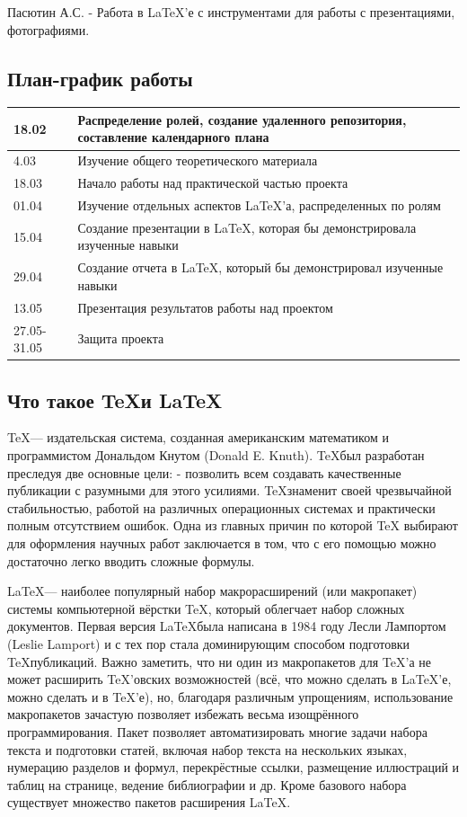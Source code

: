 \documentclass{article}
\begin{document}
\vspace{\baselineskip}
Пасютин А.С. - Работа в LaTeX’е с инструментами для работы с презентациями, фотографиями.

\subsection*{План-график работы}
\begin{tabular}{|l|p{}|}
	\hline
	18.02 & Распределение ролей, создание удаленного репозитория, составление календарного плана \\
	\hline
	4.03 & Изучение общего теоретического материала \\
	\hline
	18.03 & Начало работы над практической частью проекта \\
	\hline
	01.04 & Изучение отдельных аспектов \LaTeX’а, распределенных по ролям \\
	\hline
	15.04 & Создание презентации в \LaTeX, которая бы демонстрировала изученные навыки \\
	\hline
	29.04 & Создание отчета в \LaTeX, который бы демонстрировал изученные навыки
	\\
	\hline
	13.05 & Презентация результатов работы над проектом \\
	\hline
	27.05-31.05 & Защита проекта \\
	\hline
\end{tabular}

\subsection*{Что такое \TeX и \LaTeX}
\TeX — издательская система, созданная американским математиком и программистом Дональдом Кнутом (Donald E. Knuth). \TeX был разработан преследуя две основные цели: - позволить всем создавать качественные публикации с разумными для этого усилиями. \TeX знаменит своей чрезвычайной стабильностью, работой на различных операционных системах и практически полным отсутствием ошибок. Одна из главных причин по которой TeX выбирают для оформления научных работ заключается в том, что с его помощью можно достаточно легко вводить сложные формулы.

\vspace{\baselineskip}
\LaTeX — наиболее популярный набор макрорасширений (или макропакет) системы компьютерной вёрстки TeX, который облегчает набор сложных документов. Первая версия \LaTeX была написана в 1984 году Лесли Лампортом (Leslie Lamport) и с тех пор стала доминирующим способом подготовки \TeX публикаций. Важно заметить, что ни один из макропакетов для \TeX’а не может расширить \TeX’овских возможностей (всё, что можно сделать в LaTeX’е, можно сделать и в \TeX’е), но, благодаря различным упрощениям, использование макропакетов зачастую позволяет избежать весьма изощрённого программирования. Пакет позволяет автоматизировать многие задачи набора текста и подготовки статей, включая набор текста на нескольких языках, нумерацию разделов и формул, перекрёстные ссылки, размещение иллюстраций и таблиц на странице, ведение библиографии и др. Кроме базового набора существует множество пакетов расширения \LaTeX.
\end{document}
